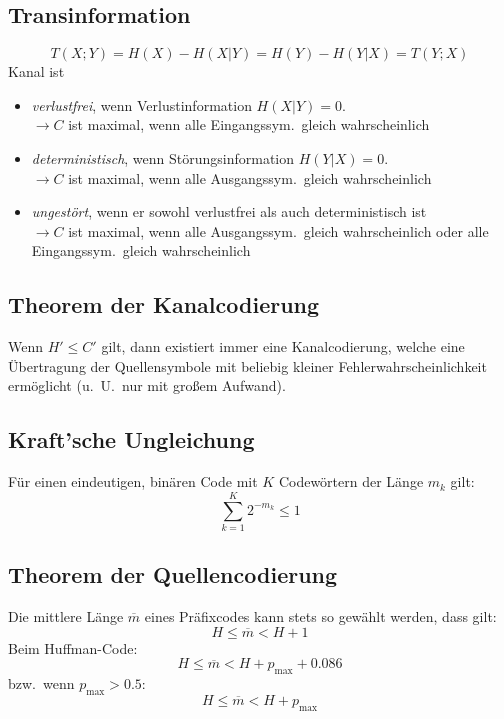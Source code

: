 \subsection*{Transinformation}
\[
    T(X; Y) = H(X) - H(X | Y) = H(Y) - H(Y | X) = T(Y; X)
\]
Kanal ist 
\begin{itemize}
	\setlength{\parskip}{0pt}
	\setlength{\itemsep}{0pt plus 1pt}
    \item \textit{verlustfrei}, wenn Verlustinformation $ H(X | Y) = 0. $ \\
        $ \rightarrow C $ ist maximal, wenn alle Eingangssym.\ gleich
        wahrscheinlich
    \item \textit{deterministisch}, wenn Störungsinformation $ H(Y | X) = 0. $ \\
        $ \rightarrow C $ ist maximal, wenn alle Ausgangssym.\ gleich
        wahrscheinlich
    \item \textit{ungestört}, wenn er sowohl verlustfrei als auch
        deterministisch ist \\
        $ \rightarrow C $ ist maximal, wenn alle Ausgangssym.\ gleich
        wahrscheinlich oder alle Eingangssym.\ gleich wahrscheinlich
\end{itemize}

\subsection*{Theorem der Kanalcodierung}
Wenn $ H' \leq C' $ gilt, dann existiert immer eine Kanalcodierung, welche eine
Übertragung der Quellensymbole mit beliebig kleiner Fehlerwahrscheinlichkeit
ermöglicht (u.\ U.\ nur mit großem Aufwand).

\subsection*{Kraft'sche Ungleichung}
Für einen eindeutigen, binären Code mit $ K $ Codewörtern der Länge $ m_k $ gilt:
\[
    \sum_{k=1}^{K} 2^{-m_k} \le 1
\]

\subsection*{Theorem der Quellencodierung}
Die mittlere Länge $ \overline{m} $ eines Präfixcodes kann stets so gewählt
werden, dass gilt:
\[
    H \leq \overline{m} < H + 1
\]
Beim Huffman-Code:
\[
    H \leq \overline{m} < H + p_{\max} + 0.086
\]
bzw.\ wenn $ p_{\max} > 0.5 $:
\[
    H \leq \overline{m} < H + p_{\max}
\]

